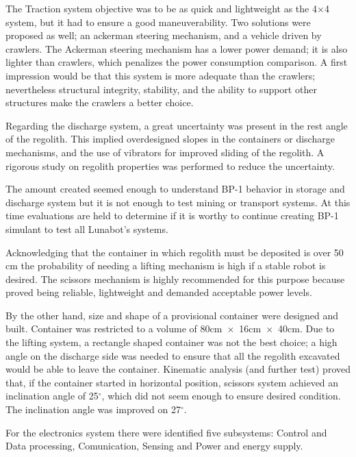 \documentclass[conference]{IEEEtran}
\begin{document}
The Traction system objective was to be as quick and lightweight as the 4$ \times $4 system, but it had to ensure a good maneuverability. Two solutions were proposed as well; an ackerman steering mechanism, and a vehicle driven by crawlers. The Ackerman steering mechanism has a lower power demand; it is also lighter than crawlers, which penalizes the power consumption comparison. A first impression would be that this system is more adequate than the crawlers; nevertheless structural integrity, stability, and the ability to support other structures make the crawlers a better choice. 


Regarding the discharge system, a great uncertainty was present in the rest angle of the regolith.  This implied overdesigned slopes in the containers or discharge mechanisms, and the use of vibrators for improved sliding of the regolith. A rigorous study on regolith properties was performed to reduce the uncertainty. 

The amount created seemed enough to understand BP-1 behavior in storage and discharge system but it is not enough to test mining or transport systems.  At this time evaluations are held to determine if it is worthy to continue creating BP-1 simulant to test all Lunabot's systems. 

Acknowledging that the container in which regolith must be deposited is over 50 cm the probability of needing a lifting mechanism is high if a stable robot is desired. The scissors mechanism is highly recommended for this purpose because proved being reliable, lightweight and demanded acceptable power levels.

By the other hand, size and shape of a provisional container were designed and built. Container was restricted to a volume of 80cm~$\times$~16cm~$\times$~40cm. Due to the lifting system, a rectangle shaped container was not the best choice; a high angle on the discharge side was needed to ensure that all the regolith excavated would be able to leave the container. Kinematic analysis (and further test) proved that, if the container started in horizontal position, scissors system achieved an inclination angle of 25$^\circ $, which did not seem enough to ensure desired condition. The inclination angle was improved on 27$^\circ $.

For the electronics system there were identified five subsystems: Control and Data processing, Comunication, Sensing and Power and energy supply.
\end{document}
